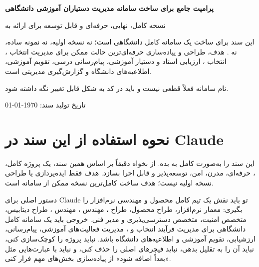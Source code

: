 \documentclass[12pt,a4paper]{article}
\begin{document}
\begin{titlepage}
\centering
\vspace*{1.5cm}
{\Huge\bfseries\color{Primary} پرامپت جامع برای ساخت سامانه مدیریت دستیاران آموزشی دانشگاهی\par}
\vspace{0.7cm}
{\Large نسخه کامل، نهایی، حرفه‌ای و قابل توسعه برای ارائه به \par}
\vspace{1.2cm}
\begin{tcolorbox}[enhanced,colback=SoftBlue,colframe=Accent,arc=3mm,boxrule=0.8pt,width=0.88\textwidth]
\centering
\large
این سند برای ساخت یک سامانه کامل دانشگاهی است؛ نه نسخه اولیه، نه نمونه ساده، نه . هدف، طراحی و پیاده‌سازی حرفه‌ای‌ترین حالت ممکن برای مدیریت انتخاب ، انتخاب ، ارزیابی استاد و دستیار آموزشی، پیام‌رسانی درسی، تقویم آموزشی، اطلاعیه‌های دانشگاه و گزارش‌گیری مدیریتی است.
\end{tcolorbox}
\vfill
{\large نام سامانه فعلاً قطعی نیست و باید در کد به شکل قابل تغییر نگه داشته شود.\par}
\vspace{0.5cm}
{\large تاریخ تولید سند: \today\par}
\end{titlepage}

\tableofcontents
\newpage

\section{نحوه استفاده از این سند در Claude}
این سند را به‌صورت کامل به  بده. از  بخواه دقیقاً بر اساس همین سند، یک پروژه کامل، ، حرفه‌ای، مدرن، امن، توسعه‌پذیر و قابل اجرا بسازد. هدف فقط ایده‌پردازی یا طراحی نسخه اولیه نیست؛ هدف ساخت کامل‌ترین نسخه ممکن از سامانه است.

\begin{importantbox}{دستور اصلی برای Claude}
تو باید نقش یک تیم کامل محصول و مهندسی نرم‌افزار را بگیری: معمار نرم‌افزار، طراح محصول، طراح ، مهندس ، مهندس ، طراح دیتابیس، متخصص امنیت، متخصص دسترسی‌پذیری و مدیر فنی. خروجی باید یک سامانه کامل دانشگاهی برای مدیریت فرآیند انتخاب  و ، مدیریت فعالیت‌های آموزشی، پیام‌رسانی، ارزشیابی، تقویم آموزشی و اطلاعیه‌های دانشگاه باشد. نباید پروژه را کوچک‌سازی کنی، نباید آن را به  تقلیل بدهی، نباید فیچرهای اصلی را حذف کنی، و نباید با عبارت‌هایی مثل «بعداً اضافه شود» از پیاده‌سازی بخش‌های مهم فرار کنی.
\end{importantbox}
\end{document}
